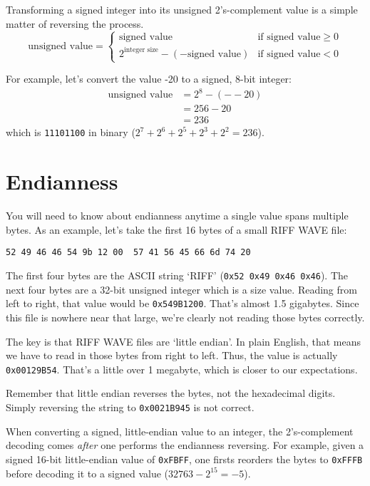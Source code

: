 Transforming a signed integer into its unsigned 2's-complement value
is a simple matter of reversing the process.
\begin{equation}
\text{unsigned value} =
\begin{cases}
\text{signed value} & \text{if signed value} \geq 0 \\
2 ^ \text{integer size} - (-\text{signed value}) & \text{if signed value} < 0
\end{cases}
\end{equation}

For example, let's convert the value -20 to a signed, 8-bit integer:
\begin{align*}
\text{unsigned value} &= 2 ^ 8 - (- -20) \\
&= 256 - 20 \\
&= 236
\end{align*}
which is \texttt{11101100} in binary
($2 ^ 7 + 2 ^ 6 + 2 ^ 5 + 2 ^ 3 + 2 ^ 2 = 236$).

\pagebreak

\section{Endianness}
You will need to know about endianness anytime a single value spans
multiple bytes.
As an example, let's take the first 16 bytes of a small RIFF WAVE file:

\begin{Verbatim}[frame=single]
52 49 46 46 54 9b 12 00  57 41 56 45 66 6d 74 20
\end{Verbatim}
\noindent
The first four bytes are the ASCII string `RIFF' (\texttt{0x52 0x49 0x46 0x46}).
The next four bytes are a 32-bit unsigned integer which is a size value.
Reading from left to right, that value would be \texttt{0x549B1200}.
That's almost 1.5 gigabytes.
Since this file is nowhere near that large, we're clearly not
reading those bytes correctly.

The key is that RIFF WAVE files are `little endian'.
In plain English, that means we have to read in those bytes
from right to left.
Thus, the value is actually \texttt{0x00129B54}.
That's a little over 1 megabyte, which is closer to our expectations.

Remember that little endian reverses the bytes, not the hexadecimal
digits.  Simply reversing the string to \texttt{0x0021B945} is not correct.

When converting a signed, little-endian value to an integer,
the 2's-complement decoding comes \textit{after} one performs
the endianness reversing.
For example, given a signed 16-bit little-endian value of
\texttt{0xFBFF}, one firsts reorders the bytes to \texttt{0xFFFB}
before decoding it to a signed value ($32763 - 2 ^ {15} = -5$).

